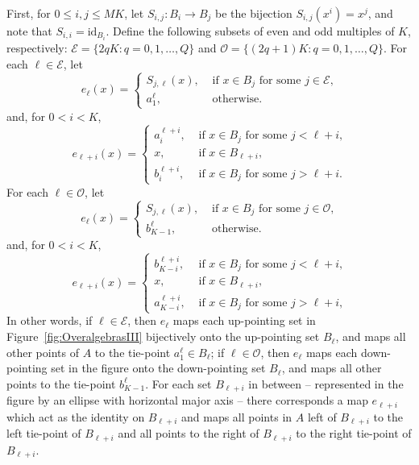 \documentclass[cm,dissertation]{uhthesis}
\theoremstyle{plain}
\theoremstyle{definition}
\theoremstyle{remark}
\numberwithin{theorem}{section}
\numberwithin{claim}{chapter}
\numberwithin{equation}{section}
\numberwithin{conjecture}{chapter}
\newcommand{\<}{\ensuremath{\langle}}
\renewcommand{\>}{\ensuremath{\rangle}}
\renewcommand{\leq}{\ensuremath{\leqslant}}
\newcommand{\supi}{\ensuremath{^{i}}}
\newcommand{\supj}{\ensuremath{^{j}}}
\newcommand{\0}{\ensuremath{\mathbf{0}}}
\newcommand{\1}{\ensuremath{\mathbf{1}}}
\newcommand{\2}{\ensuremath{\mathbf{2}}}
\newcommand{\3}{\ensuremath{\mathbf{3}}}
\newcommand{\4}{\ensuremath{\mathbf{4}}}
\newcommand{\5}{\ensuremath{\mathbf{5}}}
\newcommand{\sE}{\ensuremath{\mathscr{E}}}
\newcommand{\sO}{\ensuremath{\mathscr{O}}}
\newcommand{\id}{\ensuremath{\mathrm{id}}}
\begin{document}
First, for $0\leq i, j \leq MK$, let $S_{i,j}:B_i \rightarrow B_j $ be the 
bijection $S_{i,j}(x\supi)=x\supj$, and note that $S_{i,i} = \id_{B_i}$.
Define the following subsets of even and odd multiples of $K$, respectively: 
$\sE = \{2qK : q = 0, 1, \dots, Q\}$ and 
$\sO= \{(2q+1)K : q = 0, 1, \dots, Q\}$. 
For each $\ell\in \sE$, let\\
\[
e_{\ell}(x)=
\begin{cases}
  S_{j,\ell}(x), &\text{ if $x\in B_{j}$ for some $j \in \sE$,}\\
  a^{\ell}_1, &\text{ otherwise.}
\end{cases}
\]
and, for $0 < i < K$,
\[
e_{\ell+i}(x)=
\begin{cases}
  a_i^{\ell+i}, &\text{ if $x\in B_{j}$ for some $j < \ell+i$,}\\ 
  x, &\text{ if $x\in B_{\ell+i}$,}\\
  b_i^{\ell+i}, &\text{ if $x\in B_{j}$ for some $j > \ell+i$.}
\end{cases}
\]
For each $\ell\in \sO$, let \\
\[
e_{\ell}(x)=
\begin{cases}
  S_{j,\ell}(x), &\text{ if $x\in B_{j}$ for some $j \in \sO$,}\\
  b^{\ell}_{K-1}, &\text{ otherwise.}
\end{cases}
\]
and, for $0 < i < K$,
\[
e_{\ell+i}(x)=
\begin{cases}
  b_{K-i}^{\ell+i}, &\text{ if $x\in B_{j}$ for some $j < \ell+i$,}\\ 
  x, &\text{ if $x\in B_{\ell+i}$,}\\
  a_{K-i}^{\ell+i}, &\text{ if $x\in B_{j}$ for some $j > \ell+i$,}
\end{cases}
\]
In other words, if $\ell\in \sE$, then $e_{\ell}$ maps each up-pointing set in
Figure~\ref{fig:OveralgebrasIII} bijectively onto the up-pointing set 
$B_{\ell}$, and maps all other points of $A$ to the tie-point
$a^{\ell}_1\in B_{\ell}$; 
if $\ell\in \sO$, then $e_{\ell}$ maps each down-pointing set in the figure onto the
down-pointing set $B_{\ell}$, and maps all other points to the tie-point
$b^{\ell}_{K-1}$.  For each set $B_{\ell+i}$ in between -- represented in the
figure by an ellipse with horizontal major axis -- there corresponds a map
$e_{\ell+i}$ which act as the identity on $B_{\ell+i}$ and maps all points in
$A$ left of $B_{\ell+i}$ to the left tie-point of $B_{\ell+i}$ and all points to
the right of $B_{\ell+i}$ to the right tie-point of $B_{\ell+i}$.
\end{document}
